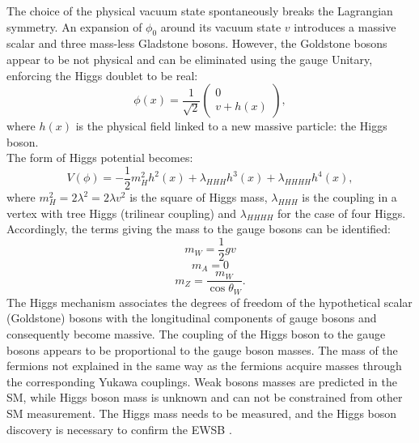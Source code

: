 The choice of the physical vacuum state spontaneously breaks the Lagrangian symmetry. An expansion of $\phi_0$ around its vacuum state $v$ introduces a massive scalar and three mass-less Gladstone bosons. However, the Goldstone bosons appear to be not physical and can be eliminated using the gauge Unitary, enforcing the Higgs doublet to be real:
\begin{equation}
    \phi(x)=\frac{1}{\sqrt{2}}\left(\begin{array}{c}
0 \\
v+h(x)
\end{array}\right),
\end{equation}
where $h(x)$ is the physical field linked to a new massive particle: the Higgs boson. \\
The form of Higgs potential becomes: 
\begin{equation}
    V(\phi)=-\frac{1}{2} m_{H}^{2} h^{2}(x)+\lambda_{H H H} h^{3}(x)+\lambda_{H H H H} h^{4}(x),
\end{equation}
where $m_{H}^{2}=2 \lambda^{2}=2 \lambda v^{2}$ is the square of Higgs mass, $\lambda_{HHH}$ is the coupling in a vertex with tree Higgs (trilinear coupling) and $\lambda_{HHHH}$ for the case of four Higgs.
Accordingly, the terms giving the mass to the gauge bosons can be identified:
\begin{equation}
m_{W} = \frac{1}{2}gv 
\end{equation}
\begin{equation}
m_{A} = 0    
\end{equation}
\begin{equation}
m_{Z} = \frac{m_{W}}{\cos\theta_{W}}.
\end{equation}
The Higgs mechanism associates the degrees of freedom of the hypothetical scalar (Goldstone) bosons with the longitudinal components of gauge bosons and consequently become massive. The coupling of the Higgs boson to the gauge bosons appears to be proportional to the gauge boson masses. The mass of the fermions not explained in the same way as the fermions acquire masses through the corresponding Yukawa couplings. Weak bosons masses are predicted in the SM, while Higgs boson mass is unknown and can not be constrained from other SM measurement. The Higgs mass needs to be measured, and the Higgs boson discovery is necessary to confirm the EWSB \cite{EWSB}.

